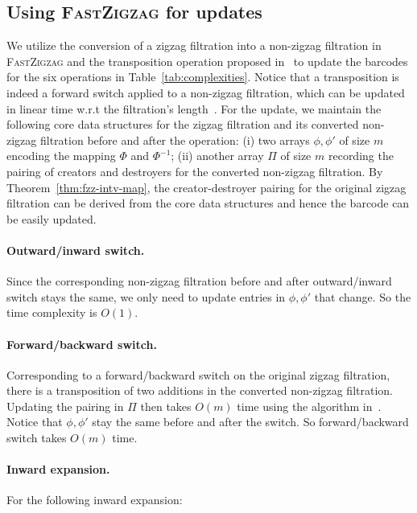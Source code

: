 \documentclass[letterpaper,11pt]{article}
\theoremstyle{mythmstyle}
\theoremstyle{mydefstyle}
\theoremstyle{plain}
\theoremstyle{definition}
\newcommand{\<}[1]{\langle #1\rangle}
\newcommand{\inv}{^{-1}}
\newcommand{\filtcnt}{m}
\begin{document}
\subsection{Using \textsc{FastZigzag} for updates}

We utilize the conversion of a zigzag filtration into a non-zigzag filtration 
in \textsc{FastZigzag}
and the transposition operation proposed in~\cite{cohen2006vines} 
to update the barcodes for the six operations in Table~\ref{tab:complexities}.
Notice that a transposition is indeed a forward switch applied to a non-zigzag
filtration, which can be updated in linear time w.r.t the filtration's length~\cite{cohen2006vines}.
For the update, we maintain the following core data structures
for the zigzag filtration and its converted non-zigzag filtration before and after the operation:
(i) two arrays $\phi,\phi'$ of size $\filtcnt$ encoding the mapping $\Phi$ and $\Phi\inv$;
(ii) another array $\Pi$ of size $\filtcnt$ recording the pairing of creators and destroyers
for the converted non-zigzag filtration.
By Theorem~\ref{thm:fzz-intv-map},
the creator-destroyer pairing for the original zigzag filtration 
can be derived from the core data structures and hence the barcode can be easily updated.

\paragraph{Outward/inward switch.}
Since the corresponding non-zigzag filtration before and after outward/inward switch
stays the same, we only need to update entries in $\phi,\phi'$ that change. So the time complexity is $O(1)$.

\paragraph{Forward/backward switch.}
Corresponding to a forward/backward switch on the original zigzag filtration,
there is a transposition of two additions in the converted non-zigzag filtration.
Updating the pairing in $\Pi$ then takes $O(\filtcnt)$ time using the algorithm in~\cite{cohen2006vines}.
Notice that $\phi,\phi'$ stay the same before and after the switch.
So forward/backward switch takes $O(\filtcnt)$ time.

\paragraph{Inward expansion.}
For the following inward expansion:
\end{document}
